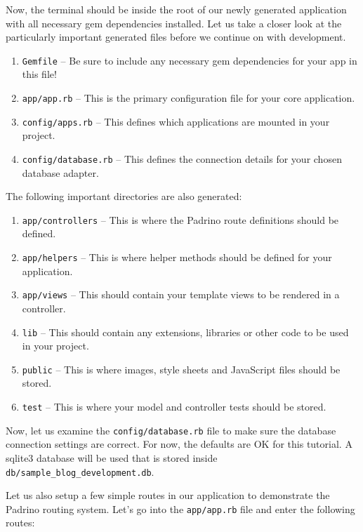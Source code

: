 Now, the terminal should be inside the root of our newly generated
application with all necessary gem dependencies installed. Let us
take a closer look at the particularly important generated files
before we continue on with development.

\begin{enumerate}
\item \verb|Gemfile| – Be sure to include any necessary gem dependencies for your app in this file!
\item \verb|app/app.rb| – This is the primary configuration file for your core application.
\item \verb|config/apps.rb| – This defines which applications are mounted in your project.
\item \verb|config/database.rb| – This defines the connection details for your chosen database adapter.
\end{enumerate}

The following important directories are also generated:

\begin{enumerate}
\item \verb|app/controllers| – This is where the Padrino route definitions should be defined.
\item \verb|app/helpers| – This is where helper methods should be defined for your application.
\item \verb|app/views| – This should contain your template views to be rendered in a controller.
\item \verb|lib| – This should contain any extensions, libraries or other code to be used in your project.
\item \verb|public| – This is where images, style sheets and JavaScript files should be stored.
\item \verb|test| – This is where your model and controller tests should be stored.
\end{enumerate}
Now, let us examine the \verb|config/database.rb| file to make sure
the database connection settings are correct. For now, the defaults
are OK for this tutorial. A sqlite3 database will be used that is
stored inside \verb|db/sample_blog_development.db|.

Let us also setup a few simple routes in our application to demonstrate
the Padrino routing system. Let’s go into the \verb|app/app.rb|
file and enter the following routes:

